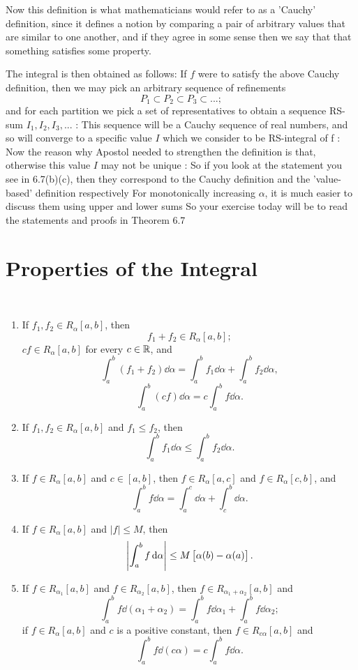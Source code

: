Now this definition is what mathematicians would refer to as a 'Cauchy' definition, since it defines a notion by comparing a pair of arbitrary values that are similar to one another, and if they agree in some sense then we say that that something satisfies some property.

The integral is then obtained as follows: If $f$ were to satisfy the above Cauchy definition, then we may pick an arbitrary sequence of refinements
\[ P_1 \subset P_2 \subset P_3 \subset ...; \]
and for each partition we pick a set of representatives to obtain a sequence RS-sum
$I_1, I_2, I_3, ...$
:
This sequence will be a Cauchy sequence of real numbers, and so will converge to a specific value $I$ which we consider to be RS-integral of f
:
Now the reason why Apostol needed to strengthen the definition is that, otherwise this value $I$ may not be unique
:
So if you look at the statement you see in 6.7(b)(c), then they correspond to the Cauchy definition and the 'value-based' definition respectively
For monotonically increasing $\alpha$, it is much easier to discuss them using upper and lower sums
So your exercise today will be to read the statements and proofs in Theorem 6.7


\section{Properties of the Integral}
\begin{theorem} \
\begin{enumerate}[label=(\arabic*)]
\item If $f_1,f_2\in R_\alpha[a,b]$, then 
\[ f_1+f_2\in R_\alpha[a,b]; \]
$cf\in R_\alpha[a,b]$ for every $c\in\mathbb R$, and
\[ \int_a^b(f_1+f_2)\dd{\alpha}=\int_a^bf_1\dd{\alpha}+\int_a^bf_2\dd{\alpha}, \]
\[ \int_a^b(cf)\dd{\alpha}=c\int_a^bf\dd{\alpha}. \]

\item If $f_1,f_2\in R_\alpha[a,b]$ and $f_1\le f_2$, then
\[ \int_a^bf_1\dd{\alpha}\le\int_a^bf_2\dd{\alpha}. \]

\item If $f\in R_\alpha[a,b]$ and $c\in[a,b]$, then $f\in R_\alpha[a,c]$ and $f\in R_\alpha[c,b]$, and
\[ \int_a^bf\dd{\alpha}=\int_a^c\dd{\alpha}+\int_c^b\dd{\alpha}. \]

\item If $f\in R_\alpha[a,b]$ and $|f|\le M$, then
\[ \left|\int_a^bf\dd{\alpha}\right|\le M\left[\alpha(b)-\alpha(a)\right]. \]

\item If $f\in R_{\alpha_1}[a,b]$ and $f\in R_{\alpha_2}[a,b]$, then $f\in R_{\alpha_1+\alpha_2}[a,b]$ and
\[ \int_a^bf\dd{(\alpha_1+\alpha_2)}=\int_a^bf\dd{\alpha_1}+\int_a^bf\dd{\alpha_2}; \]
if $f\in R_\alpha[a,b]$ and $c$ is a positive constant, then $f\in R_{c\alpha}[a,b]$ and
\[ \int_a^bf\dd{(c\alpha)}=c\int_a^bf\dd{\alpha}. \]
\end{enumerate}
\end{theorem}

